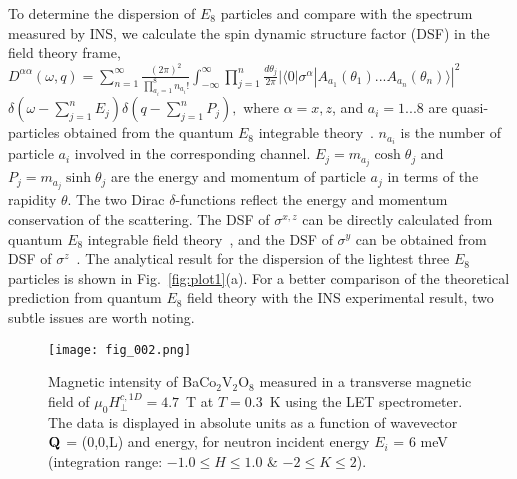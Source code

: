 \documentclass[aps,prl,twocolumn,superscriptaddress,groupedaddress]{revtex4}
\begin{document}
To determine the dispersion of $E_8$ particles and compare with the spectrum measured by INS, we calculate the spin dynamic structure factor (DSF) in the field theory frame, $D^{\alpha\alpha}(\omega,q)=\sum_{n=1}^{\infty}\frac{(2\pi)^2}{\prod_{a_{i}=1}^{8} n_{a_{i}}!}\int_{-\infty}^{\infty}\prod_{j=1}^{n}\frac{d\theta_{j}}{2\pi}|\langle 0|\sigma^{\alpha}|A_{a_{1}}(\theta_{1})...A_{a_{n}}(\theta_{n})\rangle|^{2}$\\
$\delta(\omega-\sum_{j=1}^{n}E_{j})\delta(q-\sum_{j=1}^{n}P_{j}),$
where $\alpha=x,z$, and $a_{i}=1...8$ are quasi-particles obtained from the quantum $E_{8}$ integrable theory~\cite{Zamolodchikov:1989fp,DELFINO1995724,Zou_2021,xiao_2021}. $n_{a_{i}}$ is the number of particle $a_{i}$ involved in the corresponding channel. $E_{j}=m_{a_{j}}\cosh\theta_{j}$ and $P_{j}=m_{a_{j}}\sinh\theta_{j}$ are the energy and momentum of particle $a_{j}$ in terms of the rapidity $\theta$. The two Dirac $\delta$-functions reflect the energy and momentum conservation of the scattering. The DSF of $\sigma^{x,z}$ can be directly calculated from quantum $E_{8}$ integrable field theory~\cite{xiao_2021}, and the DSF of $\sigma^{y}$ can be obtained from DSF of $\sigma^{z}$~\cite{PhysRevLett.113.247201}. The analytical result for the dispersion of the lightest three $E_8$ particles is shown in Fig.~\ref{fig:plot1}(a).
For a better comparison of the theoretical prediction from quantum $E_8$ field theory with the INS experimental result, two subtle issues are worth noting.

\begin{figure}[h]
\texttt{[image: fig\_002.png]}
\caption{Magnetic intensity of BaCo$_2$V$_2$O$_8$ measured in a transverse magnetic field of $\mu_0 H_{\bot}^{c,1D}= 4.7$~T at $T=0.3$~K using the LET spectrometer. The data is displayed in absolute units as a function of wavevector ${\bf Q}$ = (0,0,L) and energy, for neutron incident energy $E_i$ = 6 meV (integration range: $-1.0 \leq H \leq 1.0$ \& $-2 \leq K \leq 2$).
}
\label{fig:plot_maps}
\end{figure}
\end{document}
